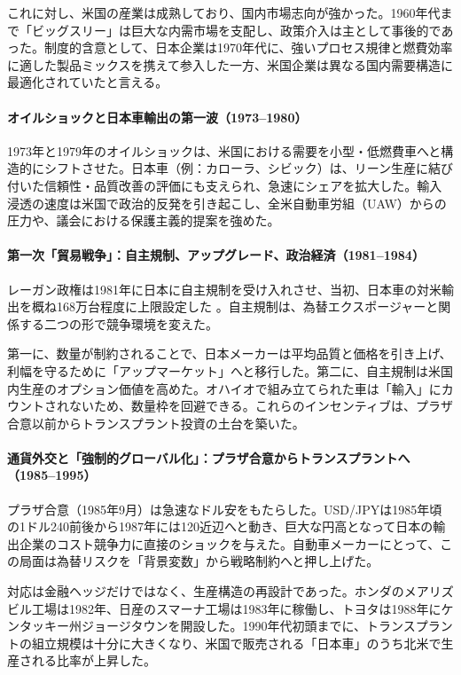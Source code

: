 \documentclass[12pt,a4paper]{article}
\begin{document}
これに対し、米国の産業は成熟しており、国内市場志向が強かった。1960年代まで「ビッグスリー」は巨大な内需市場を支配し、政策介入は主として事後的であった。制度的含意として、日本企業は1970年代に、強いプロセス規律と燃費効率に適した製品ミックスを携えて参入した一方、米国企業は異なる国内需要構造に最適化されていたと言える。

\paragraph{オイルショックと日本車輸出の第一波（1973--1980）}

1973年と1979年のオイルショックは、米国における需要を小型・低燃費車へと構造的にシフトさせた。日本車（例：カローラ、シビック）は、リーン生産に結び付いた信頼性・品質改善の評価にも支えられ、急速にシェアを拡大した。輸入浸透の速度は米国で政治的反発を引き起こし、全米自動車労組（UAW）からの圧力や、議会における保護主義的提案を強めた。

\paragraph{第一次「貿易戦争」：自主規制、アップグレード、政治経済（1981--1984）}

レーガン政権は1981年に日本に自主規制を受け入れさせ、当初、日本車の対米輸出を概ね168万台程度に上限設定した \citep{feenstra1984}。自主規制は、為替エクスポージャーと関係する二つの形で競争環境を変えた。

第一に、数量が制約されることで、日本メーカーは平均品質と価格を引き上げ、利幅を守るために「アップマーケット」へと移行した。第二に、自主規制は米国内生産のオプション価値を高めた。オハイオで組み立てられた車は「輸入」にカウントされないため、数量枠を回避できる。これらのインセンティブは、プラザ合意以前からトランスプラント投資の土台を築いた。

\paragraph{通貨外交と「強制的グローバル化」：プラザ合意からトランスプラントへ（1985--1995）}

プラザ合意（1985年9月）は急速なドル安をもたらした。USD/JPYは1985年頃の1ドル\textyen240前後から1987年には\textyen120近辺へと動き、巨大な円高となって日本の輸出企業のコスト競争力に直接のショックを与えた。自動車メーカーにとって、この局面は為替リスクを「背景変数」から戦略制約へと押し上げた。

対応は金融ヘッジだけではなく、生産構造の再設計であった。ホンダのメアリズビル工場は1982年、日産のスマーナ工場は1983年に稼働し、トヨタは1988年にケンタッキー州ジョージタウンを開設した。1990年代初頭までに、トランスプラントの組立規模は十分に大きくなり、米国で販売される「日本車」のうち北米で生産される比率が上昇した。
\end{document}

